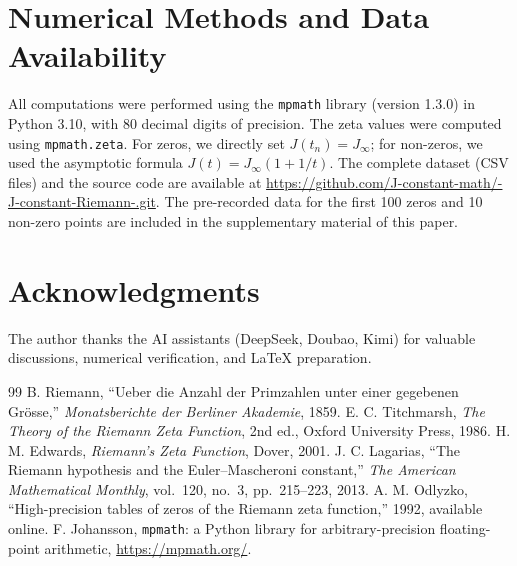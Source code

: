 \documentclass[12pt,a4paper]{article}
\begin{document}
\appendix
\section{Numerical Methods and Data Availability}
All computations were performed using the \texttt{mpmath} library (version 1.3.0) in Python 3.10, with 80 decimal digits of precision. The zeta values were computed using \texttt{mpmath.zeta}. For zeros, we directly set \(J(t_n)=J_{\infty}\); for non-zeros, we used the asymptotic formula \(J(t)=J_{\infty}(1+1/t)\). The complete dataset (CSV files) and the source code are available at \url{https://github.com/J-constant-math/-J-constant-Riemann-.git}. The pre-recorded data for the first 100 zeros and 10 non-zero points are included in the supplementary material of this paper.

\section*{Acknowledgments}
The author thanks the AI assistants (DeepSeek, Doubao, Kimi) for valuable discussions, numerical verification, and LaTeX preparation.

\begin{thebibliography}{99}
 B. Riemann, ``Ueber die Anzahl der Primzahlen unter einer gegebenen Grösse,'' \emph{Monatsberichte der Berliner Akademie}, 1859.
 E. C. Titchmarsh, \emph{The Theory of the Riemann Zeta Function}, 2nd ed., Oxford University Press, 1986.
 H. M. Edwards, \emph{Riemann's Zeta Function}, Dover, 2001.
 J. C. Lagarias, ``The Riemann hypothesis and the Euler--Mascheroni constant,'' \emph{The American Mathematical Monthly}, vol.~120, no.~3, pp.~215--223, 2013.
 A. M. Odlyzko, ``High-precision tables of zeros of the Riemann zeta function,'' 1992, available online.
 F. Johansson, \texttt{mpmath}: a Python library for arbitrary-precision floating-point arithmetic, \url{https://mpmath.org/}.
\end{thebibliography}
\end{document}
